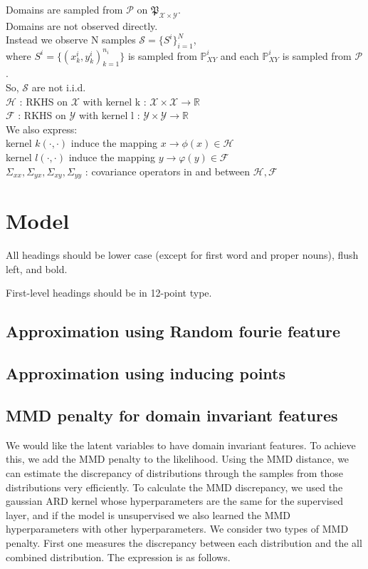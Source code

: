 \documentclass{article}
\begin{document}
Domains are sampled from $\mathcal{P}$ on $\mathfrak{P} _{\mathcal{X} \times \mathcal{Y}}$.\\
Domains are not observed directly.\\
Instead we observe N samples $\mathcal{S} = \{S^i\}_{i=1} ^N$,\\
where $S^i = \{(x _k ^i ,y _k ^i )_{k=1} ^{n _i}\}$ is sampled from $\mathbb{P} _{XY} ^i$ and each $\mathbb{P} _{XY} ^i$ is sampled from $\mathcal{P}$.\\
So, $\mathcal{S}$ are not i.i.d.\\
$\mathcal{H}$ : RKHS on $\mathcal{X} $ with kernel k : $\mathcal{X} \times \mathcal{X} \to \mathbb{R}$\\
$\mathcal{F}$ : RKHS on $\mathcal{Y} $ with kernel l : $\mathcal{Y} \times \mathcal{Y} \to \mathbb{R}$\\
We also express:\\
kernel $k(\cdot , \cdot)$ induce the mapping $x \to \phi(x) \in \mathcal{H}$\\
kernel $l(\cdot , \cdot)$ induce the mapping $y \to \varphi(y) \in \mathcal{F}$\\
$\Sigma _{xx} , \Sigma _{yx} , \Sigma _{xy} , \Sigma _{yy}$ : covariance operators in and between $\mathcal{H} , \mathcal{F}$

\section{Model}
\label{headings}

All headings should be lower case (except for first word and proper
nouns), flush left, and bold.

First-level headings should be in 12-point type.

\subsection{Approximation using Random fourie feature}

\subsection{Approximation using inducing points}

\subsection{MMD penalty for domain invariant features}
We would like the latent variables to have domain invariant features. To achieve this, we add the MMD penalty to the likelihood. Using the MMD distance, we can estimate the discrepancy of distributions through the samples from those distributions very efficiently. To calculate the MMD discrepancy, we used the gaussian ARD kernel whose hyperparameters are the same for the supervised layer, and if the model is unsupervised we also learned the MMD hyperparameters with other hyperparameters.
We consider two types of MMD penalty. First one measures the discrepancy between each distribution and the all combined distribution. The expression is as follows.
\end{document}
